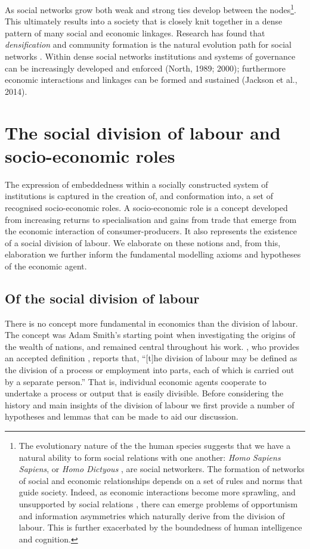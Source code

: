 As social networks grow both weak and strong ties develop between the nodes\footnote{The evolutionary nature of the the human species suggests that we have a natural ability to form social relations with one another: \emph{Homo Sapiens Sapiens}, or \emph{Homo Dictyous} \citep{ChristakisFowler2009}, are social networkers. The formation of networks of social and economic relationships depends on a set of rules and norms that guide society. Indeed, as economic interactions become more sprawling, and unsupported by social relations \citep{JacksonTan2012}, there can emerge problems of opportunism and information asymmetries which naturally derive from the division of labour. This is further exacerbated by the boundedness of human intelligence and cognition.}. This ultimately results into a society that is closely knit together in a dense pattern of many social and economic linkages. Research has found that \emph{densification} and community formation is the natural evolution path for social networks \citep{Leskovec2005a, Leskovec2007a, Leskovec2008}. Within dense social networks institutions and systems of governance can be increasingly developed and enforced (North, 1989; 2000); furthermore economic interactions and linkages can be formed and sustained (Jackson et al., 2014).

\section{The social division of labour and socio-economic roles}

The expression of embeddedness within a socially constructed system of institutions is captured in the creation of, and conformation into, a set of recognised socio-economic roles. A socio-economic role is a concept developed from increasing returns to specialisation and gains from trade that emerge from the economic interaction of consumer-producers. It also represents the existence of a social division of labour. We elaborate on these notions and, from this, elaboration we further inform the fundamental modelling axioms and hypotheses of the economic agent.

\subsection{Of the social division of labour}

There is no concept more fundamental in economics than the division of labour. The concept was Adam Smith's starting point when investigating the origins of the wealth of nations, and remained central throughout his work. \citet[p.~901]{Groenewegen1987}, who provides an accepted definition \citet[p.~4]{Sun2005}, reports that, ``[t]he division of labour may be defined as the division of a process or employment into parts, each of which is carried out by a separate person.'' That is, individual economic agents cooperate to undertake a process or output that is easily divisible. Before considering the history and main insights of the division of labour we first provide a number of hypotheses and lemmas that can be made to aid our discussion.

